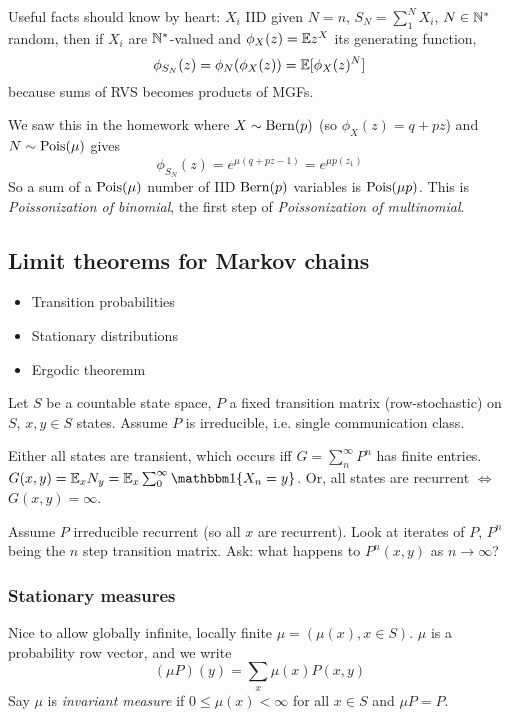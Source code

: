 
Useful facts should know by heart: $X_i$ IID given $N=n$,
$S_N = \sum_1^N X_i$, $N \in \mathbb{N}^*$ random, then if $X_i$ are $\mathbb{N}^*$-valued
and $\phi_X(z) = \mathbb{E} z^X$ its generating function,
\[
  \phi_{S_N}(z) = \phi_N(\phi_X(z)) = \mathbb{E}[\phi_X(z)^N]
\]
because sums of RVS becomes products of MGFs.

We saw this in the homework where $X \sim \operatorname{Bern}(p)$
(so $\phi_X(z) = q + p z$) and $N \sim \operatorname{Pois}(\mu)$ gives
\[
  \phi_{S_N}(z) = e^{\mu(q + pz - 1)} = e^{\mu p(z_1)}
\]
So a sum of a $\operatorname{Pois}(\mu)$ number of IID $\operatorname{Bern}(p)$ variables
is $\operatorname{Pois}(\mu p )$. This is \emph{Poissonization of binomial},
the first step of \emph{Poissonization of multinomial}.

\subsection{Limit theorems for Markov chains}

\begin{itemize}
  \item Transition probabilities
  \item Stationary distributions
  \item Ergodic theoremm
\end{itemize}

Let $S$ be a countable state space, $P$ a fixed transition matrix
(row-stochastic) on $S$, $x,y \in S$ states.
Assume $P$ is irreducible, i.e. single communication class.

Either all states are transient, which occurs iff $G = \sum_n^\infty P^n$
has finite entries. $G(x,y) = \bE_x N_y = \bE_x \sum_0^\infty \ind\{X_n=y\}$.
Or, all states are recurrent $\iff$ $G(x,y) = \infty$.

Assume $P$ irreducible recurrent (so all $x$ are recurrent).
Look at iterates of $P$, $P^n$ being the $n$ step transition matrix.
Ask: what happens to $P^n(x,y)$ as $n \to \infty$?

\subsubsection{Stationary measures}%

Nice to allow globally infinite, locally finite $\mu = (\mu(x), x \in S)$.
$\mu$ is a probability row vector, and we write
\[
  (\mu P)(y) = \sum_x \mu(x) P(x,y)
\]
Say $\mu$ is \emph{invariant measure} if $0 \leq \mu(x) < \infty$ for all $x \in S$
and $\mu P = P$.

